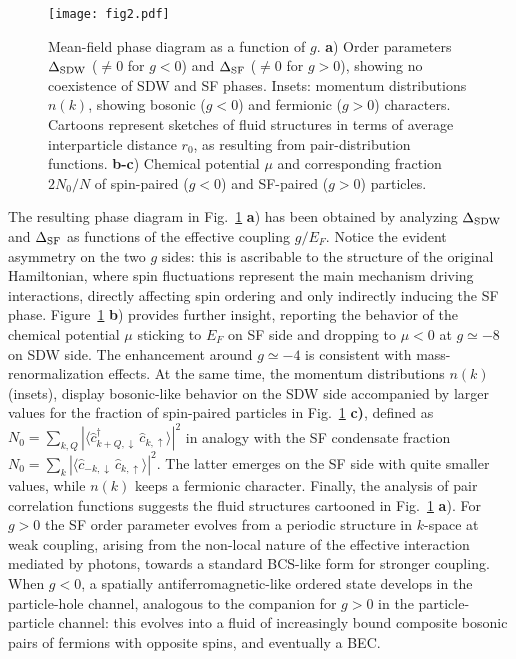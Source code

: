\documentclass[pra,aps,superscriptaddress,twocolumn]{revtex4}
\begin{document}
\begin{figure}[!htp]
  \texttt{[image: fig2.pdf]}
  \caption{Mean-field phase diagram as a function of $g$.
      \textbf{a}) Order parameters $\Delta_{\rm SDW}$ ($\neq 0$ for $g<0$) and $\Delta_{\rm SF}$ ($\neq 0$ for $g>0$),
      showing no coexistence of SDW and SF phases. Insets: momentum distributions $n(k)$,
      showing bosonic ($g<0$) and fermionic ($g>0$) characters.
      Cartoons represent sketches of fluid structures in terms of average interparticle distance $r_0$,
      as resulting from pair-distribution functions.
      \textbf{b-c}) Chemical potential $\mu$ and corresponding fraction $2N_0/N$ of spin-paired ($g<0$) and SF-paired ($g>0$) particles.}
  \label{fig:fig2}
\end{figure}
The resulting phase diagram in Fig.~\ref{fig:fig2} \textbf{a}) has been obtained by analyzing
$\Delta_{\rm SDW}$ and $\Delta_{\rm SF}$ as functions of the effective coupling $g/E_F$.
Notice the evident asymmetry on the two $g$ sides: this is ascribable to the structure of the original
Hamiltonian, where spin fluctuations represent the main mechanism driving interactions,
directly affecting spin ordering and only indirectly inducing the SF phase.
Figure~\ref{fig:fig2} \textbf{b}) provides further insight, reporting the behavior of the chemical potential $\mu$
sticking to $E_F$ on SF side and dropping to $\mu<0$ at $g\simeq -8$ on SDW side.
The enhancement around $g\simeq -4$ is consistent with mass-renormalization effects.
At the same time, the momentum distributions $n(k)$ (insets), display bosonic-like behavior
on the SDW side accompanied by larger values for the fraction of spin-paired particles in Fig.~\ref{fig:fig2} {\bf c)},
defined as $N_0=\sum_{k,Q} |\langle \hat c^\dagger_{k+Q,\downarrow} \, \hat c_{k,\uparrow}\rangle|^2$ in analogy
with the SF condensate fraction $N_0=\sum_{k}|\langle \hat c_{-k,\downarrow} \, \hat c_{k,\uparrow}\rangle|^2$.
The latter emerges on the SF side with quite smaller values, while $n(k)$ keeps a fermionic character.
Finally, the analysis of pair correlation functions suggests the fluid structures cartooned
in Fig.~\ref{fig:fig2} \textbf{a}). For $g>0$ the SF order parameter evolves from a
periodic structure in $k$-space at weak coupling, arising from the non-local nature of the effective interaction mediated by photons,
towards a standard BCS-like form for stronger coupling.
When $g<0$, a spatially antiferromagnetic-like ordered state develops in the particle-hole channel,
analogous to the companion for $g>0$ in the particle-particle channel: this evolves into a fluid of increasingly
bound composite bosonic pairs of fermions with opposite spins, and eventually a BEC.
\end{document}
